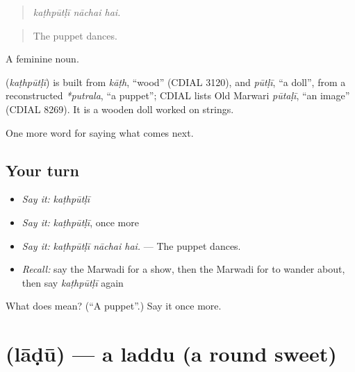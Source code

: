 \begin{quote}
  
\end{quote}

\begin{quote}
\emph{kaṭhpūtḷī nāchai hai.}
\end{quote}

\begin{quote}
The puppet dances.
\end{quote}

A feminine noun.

\begin{cousinweb}
\textbf{} (\emph{kaṭhpūtḷī}) is built from \emph{kāṭh}, \textquotedblleft{}wood\textquotedblright{} (CDIAL 3120), and \emph{pūtḷī}, \textquotedblleft{}a doll\textquotedblright{}, from a reconstructed \emph{*putrala}, \textquotedblleft{}a puppet\textquotedblright{}; CDIAL lists Old Marwari \emph{pūtaḷī}, \textquotedblleft{}an image\textquotedblright{} (CDIAL 8269). It is a wooden doll worked on strings.
\end{cousinweb}

\begin{grammarlens}[title={What you've built}]
One more word for saying what comes next.
\end{grammarlens}

\subsection*{Your turn}
\begin{itemize}
\raggedright
  \item \emph{Say it:} \emph{kaṭhpūtḷī}
  \item \emph{Say it:} \emph{kaṭhpūtḷī}, once more
  \item \emph{Say it:} \emph{kaṭhpūtḷī nāchai hai.} — The puppet dances.
  \item \emph{Recall:} say the Marwadi for a show, then the Marwadi for to wander about, then say \emph{kaṭhpūtḷī} again
\end{itemize}

\begin{tcolorbox}[breakable,colback=teal!4,colframe=teal!35!black,title={Before you move on}]
What does  mean? (\textquotedblleft{}A puppet\textquotedblright{}.) Say it once more.
\end{tcolorbox}
\section[\texorpdfstring{\mw{लाडू} (lāḍū)}{लाडू (lāḍū)}]{ (lāḍū) — a laddu (a round sweet)}


